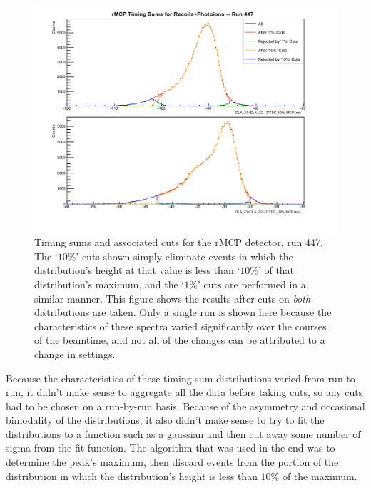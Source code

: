 \begin{figure}[h!!tb]
	\centering
	\includegraphics[width=.999\linewidth]
	{Figures/rMCP_sumcuts_447.pdf}
	\caption[Timing sums for the rMCP, run 447.]{Timing sums and associated cuts for the rMCP detector, run 447.  The `$10\%$' cuts shown simply eliminate events in which the distribution's height at that value is less than `$10\%$' of that distribution's maximum, and the `$1\%$' cuts are performed in a similar manner.  This figure shows the results after cuts on \emph{both} distributions are taken.  Only a single run is shown here because the characteristics of these spectra varied significantly over the courses of the beamtime, and not all of the changes can be attributed to a change in settings.
	}	
	\label{fig:sumcuts}
\end{figure}

Because the characteristics of these timing sum distributions varied from run to run, it didn't make sense to aggregate all the data before taking cuts, so any cuts had to be chosen on a run-by-run basis.  Because of the asymmetry and occasional bimodality of the distributions, it also didn't make sense to try to fit the distributions to a function such as a gaussian and then cut away some number of sigma from the fit function.  The algorithm that was used in the end was to determine the peak's maximum, then discard events from the portion of the distribution in which the distribution's height is less than $10\%$ of the maximum.  

